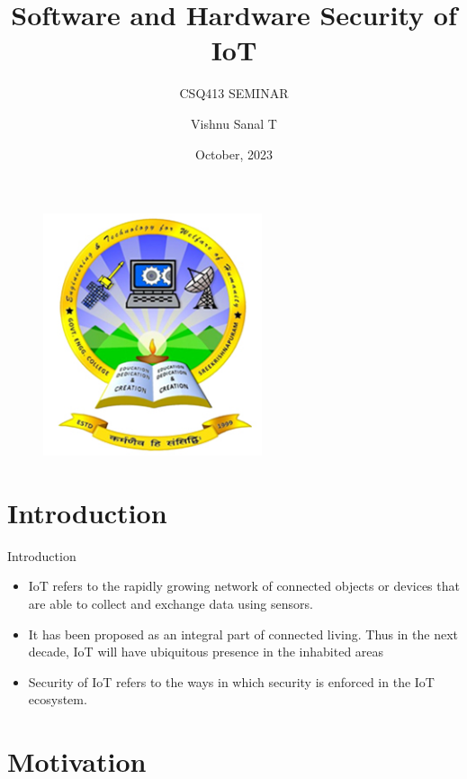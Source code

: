 \documentclass{beamer}
\author{Vishnu Sanal T}
\title{Software and Hardware Security of IoT}
\subtitle{CSQ413 SEMINAR}
\institute{
    Department of Computer Science \& Engineering \\
    Government Engineering College Palakkad
}
\date{October, 2023}
\begin{document}
\begin{frame}
    \titlepage
    \begin{figure}[htpb]
        \begin{center}
            \includegraphics[keepaspectratio, scale=0.35]{pic/college_logo.png}
        \end{center}
    \end{figure}
\end{frame}

\begin{frame}
    \tableofcontents[sectionstyle=show,subsectionstyle=show/shaded/hide,subsubsectionstyle=show/shaded/hide]
\end{frame}

\section{Introduction}

\begin{frame}{Introduction}
    \begin{itemize} %
        \item {IoT refers to the rapidly growing network of connected objects or devices that are able to collect and exchange data using sensors. \cite{qu_cr_2017}}
        \item {It has been proposed as an integral part of connected living. Thus in the next decade, IoT will have ubiquitous presence in the inhabited areas \cite{qu_cr_dev_2014}}
        \item {Security of IoT refers to the ways in which security is enforced in the IoT ecosystem.}
    \end{itemize}
\end{frame}

\section{Motivation}
\end{document}
